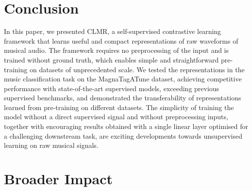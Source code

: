 
\section{Conclusion}\label{sec:conclusion}
In this paper, we presented CLMR, a self-supervised contrastive learning framework that learns useful and compact representations of raw waveforms of musical audio.
The framework requires no preprocessing of the input and is trained without ground truth, which enables simple and straightforward pre-training on datasets of unprecedented scale.
We tested the representations in the music classification task on the MagnaTagATune dataset, achieving competitive performance with state-of-the-art supervised models, exceeding previous supervised benchmarks, and demonstrated the transferability of representations learned from pre-training on different datasets.
The simplicity of training the model without a direct supervised signal and without preprocessing inputs, together with encouraging results obtained with a single linear layer optimised for a challenging downstream task, are exciting developments towards unsupervised learning on raw musical signals.

\section{Broader Impact}
